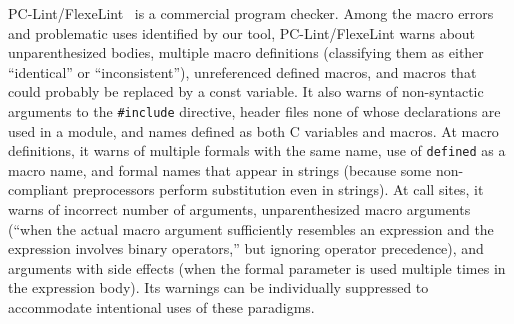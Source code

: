\documentclass[10pt]{article}
\begin{document}


PC-Lint/FlexeLint~\cite{Gimpel} is a commercial program checker.  Among the
macro errors and problematic uses identified by our tool, PC-Lint/FlexeLint
warns about unparenthesized bodies, multiple macro definitions (classifying
them as either ``identical'' or ``inconsistent''), unreferenced defined macros, and
macros that could probably be replaced by a const variable.  It also warns
of non-syntactic arguments to the {\tt \#include} directive, header files
none of whose declarations are used in a module, and names defined as both
C variables and macros.  At macro definitions, it warns of multiple formals
with the same name, use of {\tt defined} as a macro name, and formal names
that appear in strings (because some non-compliant preprocessors perform
substitution even in strings).  At call sites, it warns of incorrect number
of arguments, unparenthesized macro arguments (``when the actual macro
argument sufficiently resembles an expression and the expression involves
binary operators,'' but ignoring operator precedence), and arguments with
side effects (when the formal parameter is used multiple times in the
expression body).  Its warnings can be individually suppressed to
accommodate intentional uses of these paradigms.
\end{document}
